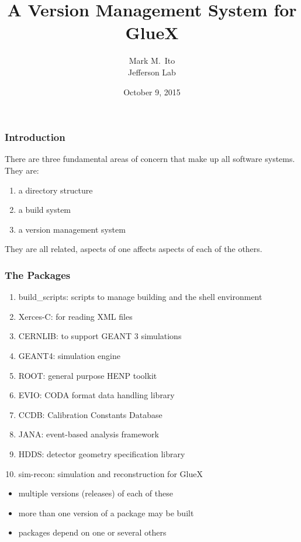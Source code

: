 \documentclass{beamer}
\title{A Version Management System for GlueX}
\author{Mark M.\ Ito \\ \medskip Jefferson Lab}
\date{October 9, 2015}
\begin{document}
\maketitle

\begin{frame}\frametitle{Introduction}
There are three fundamental areas of concern that make up all software
systems. They are:

\begin{enumerate}
\item a directory structure
\item a build system
\item a version management system
\end{enumerate}

They are all related, aspects of one affects aspects of each of the others.

\end{frame}\begin{frame}\frametitle{The Packages}

\begin{enumerate}
\item build\_scripts: scripts to manage building and the shell environment
\item Xerces-C: for reading XML files
\item CERNLIB: to support GEANT 3 simulations
\item GEANT4: simulation engine
\item ROOT: general purpose HENP toolkit
\item EVIO: CODA format data handling library
\item CCDB: Calibration Constants Database
\item JANA: event-based analysis framework
\item HDDS: detector geometry specification library 
\item sim-recon: simulation and reconstruction for GlueX
\end{enumerate}

\begin{itemize}
\item multiple versions (releases) of each of these
\item more than one version of a package may be built
\item packages depend on one or several others
\end{itemize}

\end{frame}
\end{document}

